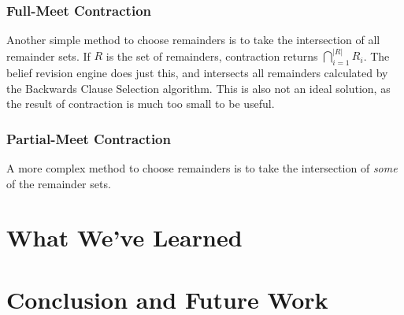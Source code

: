 \documentclass[a4paper,10pt]{article}
\newcommand{\norm}[1]{\lvert #1 \rvert}
\begin{document}
\subsubsection{Full-Meet Contraction}
\label{sec:fullmeet}
Another simple method to choose remainders is to take the intersection of all remainder sets. If $R$ is the set of remainders, contraction returns $\bigcap\limits_{i=1}^{\norm{R}} R_i$. The belief revision engine does just this, and intersects all remainders calculated by the Backwards Clause Selection algorithm. This is also not an ideal solution, as the result of contraction is much too small to be useful.

\subsubsection{Partial-Meet Contraction}
\label{sec:partialmeet}
A more complex method to choose remainders is to take the intersection of \textit{some} of the remainder sets.


\section{What We've Learned}
\label{sec:learned}


\section{Conclusion and Future Work}
\label{sec:conclusion}



\end{document}
